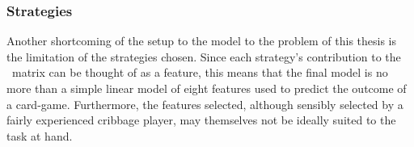 
\subsubsection*{Strategies}
\label{sec:disc-shortcomings-strategies}


Another shortcoming of the setup to the model to the problem of this thesis is
the limitation of the strategies chosen.
%
Since each strategy's contribution to the \Smat\ matrix can be thought of as
a feature,
this means that the final model is no more than a simple linear model of
eight features
used to predict the outcome of a card-game.
%
Furthermore,
the features selected,
although sensibly selected by a fairly experienced cribbage player,
may themselves not be ideally suited to the task at hand.
